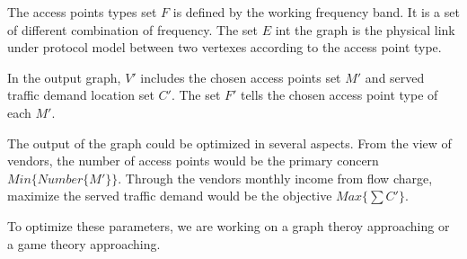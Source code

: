 The access points types set $F$ is defined by the working frequency band. It is 
a set of different combination of frequency. The set $E$ int the graph is the 
physical link under protocol model between two vertexes according to the access 
point type.

In the output graph, $V'$ includes the chosen access points set $M'$ and served 
traffic demand location set $C'$. The set $F'$ tells the chosen access point 
type of each $M'$. 

% 

The output of the graph could be optimized in several aspects. From the view of vendors,
the number of access points would be the primary concern $Min{\{Number\{M'\}\}}$.
Through the vendors monthly income from flow charge, maximize the served traffic
demand would be the objective $Max{\{\sum{C'}\}}$. 

To optimize these parameters, we are working on a graph theroy 
approaching or a game theory approaching.


